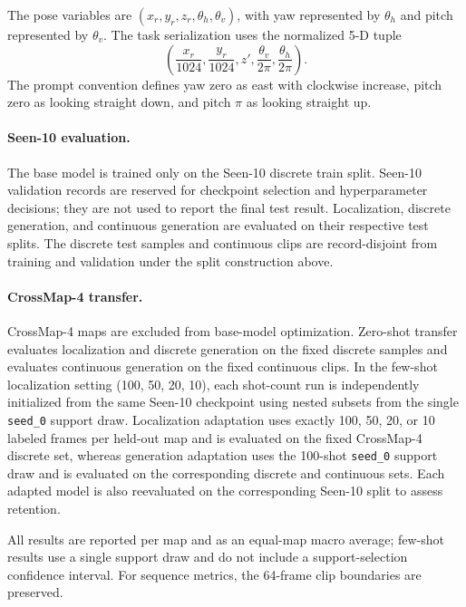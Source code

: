 The pose variables are $(x_r,y_r,z_r,\theta_h,\theta_v)$, with yaw represented by $\theta_h$ and pitch represented by $\theta_v$.
The task serialization uses the normalized 5-D tuple
\begin{equation}
    \left(\frac{x_r}{1024},\frac{y_r}{1024},z',
    \frac{\theta_v}{2\pi},\frac{\theta_h}{2\pi}\right).
\end{equation}
The prompt convention defines yaw zero as east with clockwise increase, pitch zero as looking straight down, and pitch $\pi$ as looking straight up.

\paragraph{Seen-10 evaluation.}
The base model is trained only on the Seen-10 discrete train split.
Seen-10 validation records are reserved for checkpoint selection and hyperparameter decisions; they are not used to report the final test result.
Localization, discrete generation, and continuous generation are evaluated on their respective test splits.
The discrete test samples and continuous clips are record-disjoint from training and validation under the split construction above.

\paragraph{CrossMap-4 transfer.}
CrossMap-4 maps are excluded from base-model optimization.
Zero-shot transfer evaluates localization and discrete generation on the fixed discrete samples and evaluates continuous generation on the fixed continuous clips.
In the few-shot localization setting (100, 50, 20, 10), each shot-count run is independently initialized from the same Seen-10 checkpoint using nested subsets from the single \texttt{seed\_0} support draw.
Localization adaptation uses exactly 100, 50, 20, or 10 labeled frames per held-out map and is evaluated on the fixed CrossMap-4 discrete set, whereas generation adaptation uses the 100-shot \texttt{seed\_0} support draw and is evaluated on the corresponding discrete and continuous sets.
Each adapted model is also reevaluated on the corresponding Seen-10 split to assess retention.

All results are reported per map and as an equal-map macro average; few-shot results use a single support draw and do not include a support-selection confidence interval.
For sequence metrics, the 64-frame clip boundaries are preserved.
